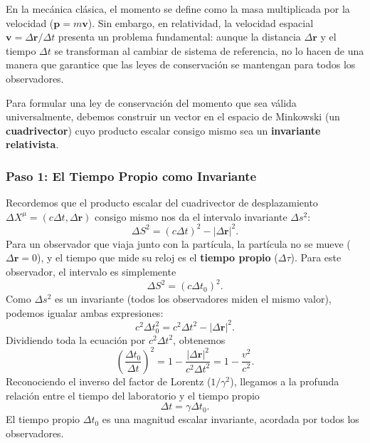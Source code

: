 \documentclass[11pt,a4paper]{book}
\begin{document}
En la mecánica clásica, el momento se define como la masa multiplicada por la velocidad ($\boldsymbol{p} = m\boldsymbol{v}$). Sin embargo, en relatividad, la velocidad espacial $\boldsymbol{v} = \Delta \boldsymbol{r} / \Delta t$ presenta un problema fundamental: aunque la distancia $\Delta \boldsymbol{r}$ y el tiempo $\Delta t$ se transforman al cambiar de sistema de referencia, no lo hacen de una manera que garantice que las leyes de conservación se mantengan para todos los observadores.

Para formular una ley de conservación del momento que sea válida universalmente, debemos construir un vector en el espacio de Minkowski (un \textbf{cuadrivector}) cuyo producto escalar consigo mismo sea un \textbf{invariante relativista}.

\subsubsection{Paso 1: El Tiempo Propio como Invariante}

Recordemos que el producto escalar del cuadrivector de desplazamiento $\Delta X^\mu = (c\Delta t, \Delta \boldsymbol{r})$ consigo mismo nos da el intervalo invariante $\Delta s^2$:
\begin{equation}
    \Delta S^2 = (c\Delta t)^2 - |\Delta \boldsymbol{r}|^2.
\end{equation}
Para un observador que viaja junto con la partícula, la partícula no se mueve ($\Delta \boldsymbol{r} = 0$), y el tiempo que mide su reloj es el \textbf{tiempo propio} ($\Delta \tau$). Para este observador, el intervalo es simplemente
\begin{equation}
    \Delta S^2 = (c\Delta t_0)^2.
\end{equation}
Como $\Delta s^2$ es un invariante (todos los observadores miden el mismo valor), podemos igualar ambas expresiones:
\begin{equation}
    c^2 \Delta t_0^2 = c^2 \Delta t^2 - |\Delta \boldsymbol{r}|^2.
\end{equation}
Dividiendo toda la ecuación por $c^2 \Delta t^2$, obtenemos
\begin{equation}
    \left( \frac{\Delta t_0}{\Delta t} \right)^2 = 1 - \frac{|\Delta \boldsymbol{r}|^2}{c^2 \Delta t^2} = 1 - \frac{v^2}{c^2}.
\end{equation}
Reconociendo el inverso del factor de Lorentz ($1/\gamma^2$), llegamos a la profunda relación entre el tiempo del laboratorio y el tiempo propio
\begin{equation}
    \Delta t = \gamma \Delta t_0.
    \label{eq:tiempo_propio}
\end{equation}
El tiempo propio $\Delta t_0$ es una magnitud escalar invariante, acordada por todos los observadores.
\end{document}
